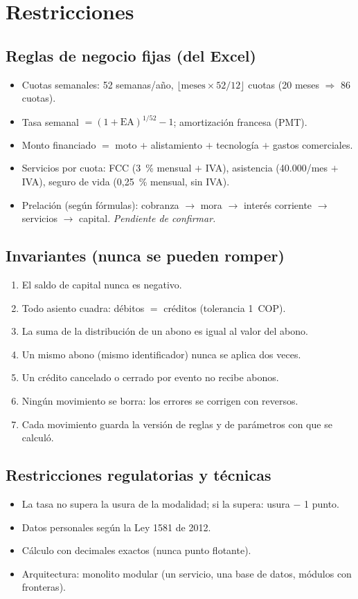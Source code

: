 \documentclass[11pt,a4paper]{article}
\begin{document}
\section{Restricciones}

\subsection*{Reglas de negocio fijas (del Excel)}
\begin{itemize}
  \item Cuotas semanales: 52 semanas/año, $\lfloor \text{meses}\times 52/12 \rfloor$ cuotas
        (20 meses $\Rightarrow$ 86 cuotas).
  \item Tasa semanal $= (1+\text{EA})^{1/52}-1$; amortización francesa (PMT).
  \item Monto financiado $=$ moto $+$ alistamiento $+$ tecnología $+$ gastos comerciales.
  \item Servicios por cuota: FCC (3~\% mensual $+$ IVA), asistencia (40.000/mes $+$ IVA),
        seguro de vida (0,25~\% mensual, sin IVA).
  \item Prelación (según fórmulas): cobranza $\rightarrow$ mora $\rightarrow$ interés corriente
        $\rightarrow$ servicios $\rightarrow$ capital. \textit{Pendiente de confirmar.}
\end{itemize}

\subsection*{Invariantes (nunca se pueden romper)}
\begin{enumerate}
  \item El saldo de capital nunca es negativo.
  \item Todo asiento cuadra: débitos $=$ créditos (tolerancia 1~COP).
  \item La suma de la distribución de un abono es igual al valor del abono.
  \item Un mismo abono (mismo identificador) nunca se aplica dos veces.
  \item Un crédito cancelado o cerrado por evento no recibe abonos.
  \item Ningún movimiento se borra: los errores se corrigen con reversos.
  \item Cada movimiento guarda la versión de reglas y de parámetros con que se calculó.
\end{enumerate}

\subsection*{Restricciones regulatorias y técnicas}
\begin{itemize}
  \item La tasa no supera la usura de la modalidad; si la supera: usura $-$ 1 punto.
  \item Datos personales según la Ley 1581 de 2012.
  \item Cálculo con decimales exactos (nunca punto flotante).
  \item Arquitectura: monolito modular (un servicio, una base de datos, módulos con fronteras).
\end{itemize}
\end{document}
